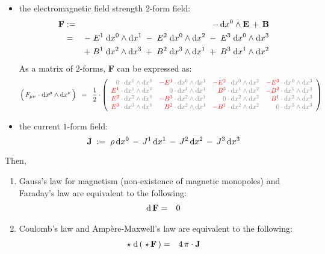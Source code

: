 \begin{theorem}
\begin{itemize}
\item
	the electromagnetic field strength $2$-form field:
	\begin{eqnarray*}
	\mathbf{F}
	& := &
		- \, \textnormal{d} x^{0} \wedge \mathbf{E} \, + \, \mathbf{B}
	\\
	& = &
		- \; E^{1}\;\textnormal{d} x^{0} \wedge \textnormal{d} x^{1} \; - \; E^{2}\;\textnormal{d} x^{0} \wedge \textnormal{d} x^{2} \; - \; E^{3}\;\textnormal{d} x^{0} \wedge \textnormal{d} x^{3}
	\\
	&&
		+\;
		B^{1}\;\textnormal{d} x^{2} \wedge \textnormal{d} x^{3}
		\;+\;
		B^{2}\;\textnormal{d} x^{3} \wedge \textnormal{d} x^{1}
		\;+\;
		B^{3}\;\textnormal{d} x^{1} \wedge \textnormal{d} x^{2}
	\end{eqnarray*}
	As a matrix of $2$-forms, $\mathbf{F}$ can be expressed as:
	\begin{equation*}
	\left(\,F_{\mu\nu}\overset{{\color{white}1}}{\cdot}\d x^{\mu} \wedge \d x^{\nu}\,\right)
	\;\; = \;\;
	\dfrac{1}{2}\cdot
	\left({\color{gray}\begin{array}{rrrr}
	0\cdot\d x^{0}\wedge\d x^{0} &
	{\color{red}-E^{1}} \cdot\d x^{0}\wedge\d x^{1} &
	{\color{red}-E^{2}} \cdot\d x^{0}\wedge\d x^{2} &
	{\color{red}-E^{3}} \cdot\d x^{0}\wedge\d x^{3}
	\\
	{\color{red}E^{1}} \cdot\d x^{1}\wedge\d x^{0} &
	0 \cdot\d x^{1}\wedge\d x^{1} &
	{\color{red}B^{3}} \cdot\d x^{1}\wedge\d x^{2} &
	{\color{red}-B^{2}} \cdot\d x^{1}\wedge\d x^{3}
	\\
	{\color{red}E^{2}} \cdot\d x^{2}\wedge\d x^{0} &
	{\color{red}-B^{3}} \cdot\d x^{2}\wedge\d x^{1} &
	0 \cdot\d x^{2}\wedge\d x^{2} &
	{\color{red}B^{1}} \cdot\d x^{2}\wedge\d x^{3}
	\\
	{\color{red}E^{3}} \cdot\d x^{3}\wedge\d x^{0} &
	{\color{red}B^{2}} \cdot\d x^{2}\wedge\d x^{1} &
	{\color{red}-B^{1}} \cdot\d x^{2}\wedge\d x^{2} &
	0 \cdot\d x^{3}\wedge\d x^{3}
	\end{array}}\right)
	\end{equation*}
\item
	the current $1$-form field:
	\begin{equation*}
	\mathbf{J} \; := \; \rho \, \textnormal{d} x^{0} \,-\, J^{1}\,\textnormal{d} x^{1} \,-\, J^{2}\,\textnormal{d} x^{2} \,-\, J^{3}\,\textnormal{d} x^{3}
	\end{equation*}
\end{itemize}
Then,
\begin{enumerate}
\item
	Gauss's law for magnetism (non-existence of magnetic monopoles) and Faraday's law are equivalent to the following:
	\begin{eqnarray*}
	\textnormal{d}\,\mathbf{F} & = & 0
	\end{eqnarray*}
\item
	Coulomb's law and Amp\`{e}re-Maxwell's law are equivalent to the following:
	\begin{eqnarray*}
	\star\;\textnormal{d} \left(\;\star\,\mathbf{F}\,\right) & = & 4\,\pi\cdot\mathbf{J}
	\end{eqnarray*}	
\end{enumerate}
\end{theorem}
